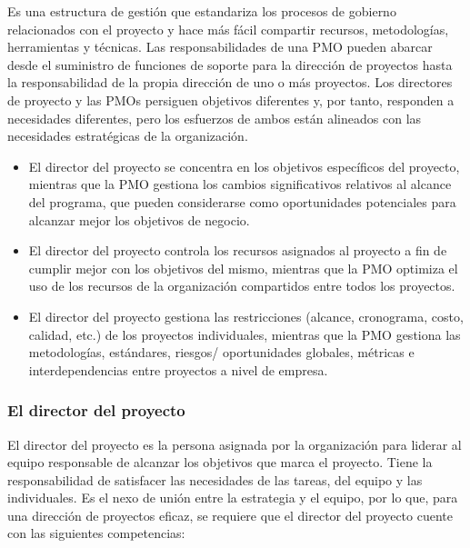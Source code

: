 Es una estructura de gestión que estandariza los procesos de gobierno relacionados con el proyecto y hace más fácil compartir recursos, metodologías, herramientas y técnicas. Las responsabilidades de una PMO pueden abarcar desde el suministro de funciones de soporte para la dirección de proyectos hasta la responsabilidad de la propia dirección de uno o más proyectos. Los directores de proyecto y las PMOs persiguen objetivos diferentes y, por tanto, responden a necesidades diferentes, pero los esfuerzos de ambos están alineados con las necesidades estratégicas de la organización.

\begin{itemize}

\item{El director del proyecto se concentra en los objetivos específicos del proyecto, mientras que la PMO 
gestiona los cambios significativos relativos al alcance del programa, que pueden considerarse como 
oportunidades potenciales para alcanzar mejor los objetivos de negocio.}

\item{El  director  del  proyecto  controla  los  recursos  asignados  al  proyecto  a  fin  de  cumplir  mejor  con  
los  objetivos  del  mismo,  mientras  que  la  PMO  optimiza  el  uso  de  los  recursos  de  la  organización  
compartidos entre todos los proyectos.}

\item{El  director  del  proyecto  gestiona  las  restricciones  (alcance,  cronograma,  costo,  calidad,  etc.)  de  
los  proyectos  individuales,  mientras  que  la  PMO  gestiona  las  metodologías,  estándares,  riesgos/
oportunidades globales, métricas e interdependencias entre proyectos a nivel de empresa.}

\end{itemize}

\subsubsection{El director del proyecto}

El director del proyecto es la persona asignada por la organización para liderar al equipo responsable de alcanzar los objetivos que marca el proyecto. Tiene la responsabilidad de satisfacer las necesidades de las tareas, del equipo y las individuales. Es el nexo de unión entre la estrategia y el equipo, por lo que, para una dirección de proyectos eficaz, se requiere que el director del proyecto cuente con las siguientes competencias:

